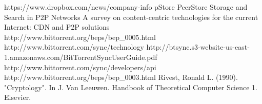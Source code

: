 \documentclass[12pt]{report}
\begin{document}


\begin{thebibliography}{11}

 https://www.dropbox.com/news/company-info
 pStore
 PeerStore
 Storage and Search in P2P Networks
 A survey on content-centric technologies for the current Internet: CDN and P2P solutions
 http://www.bittorrent.org/beps/bep\_0005.html
 http://www.bittorrent.com/sync/technology
 http://btsync.s3-website-us-east-1.amazonaws.com/BitTorrentSyncUserGuide.pdf
 http://www.bittorrent.com/sync/developers/api
 http://www.bittorrent.org/beps/bep\_0003.html
 Rivest, Ronald L. (1990). "Cryptology". In J. Van Leeuwen. Handbook of Theoretical Computer Science 1. Elsevier.

\end{thebibliography}
\end{document}

